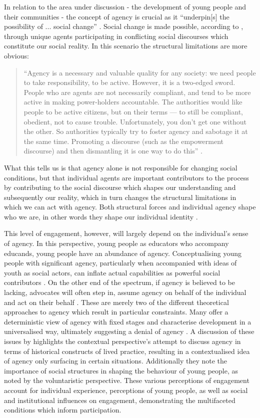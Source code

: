 In relation to the area under discussion - the development of young people and their communities - the concept of agency is crucial as it “underpin[s] the possibility of ... social change” \citep[][p243]{Barker2005}. Social change is made possible, according to \citet{Barker2005}, through unique agents participating in conflicting social discourses which constitute our social reality. In this scenario the structural limitations are more obvious: 
\begin{quote}“Agency is a necessary and valuable quality for any society: we need people to take responsibility, to be active. However, it is a two-edged sword. People who are agents are not necessarily compliant, and tend to be more active in making power-holders accountable. The authorities would like people to be active citizens, but on their terms — to still be compliant, obedient, not to cause trouble. Unfortunately, you don't get one without the other. So authorities typically try to foster agency and sabotage it at the same time. Promoting a discourse (such as the empowerment discourse) and then dismantling it is one way to do this” \citep[][p131]{Sercombe2010}. \end{quote}
What this tells us is that agency alone is not responsible for changing social conditions, but that individual agents are important contributors to the process by contributing to the social discourse which shapes our understanding and subsequently our reality, which in turn changes the structural limitations in which we can act with agency. Both structural forces and individual agency shape who we are, in other words they shape our individual identity \citep{Barker2005}. 

This level of engagement, however, will largely depend on the individual's sense of agency. In this perspective, young people as educators who accompany educands, young people have an abundance of agency. Conceptualising young people with significant agency, particularly when accompanied with ideas of youth as social actors, can inflate actual capabilities as powerful social contributors \citep[][p315]{White1998}. On the other end of the spectrum, if agency is believed to be lacking, advocates will often step in, assume agency on behalf of the individual and act on their behalf \citep[][p317]{White1998}. These are merely two of the different theoretical approaches to agency which result in particular constraints. Many offer a deterministic view of agency with fixed stages and characterise development in a universalised way, ultimately suggesting a denial of agency \citep[][p3219]{White1998}. A discussion of these issues by \citet{White1998} highlights the contextual perspective's attempt to discuss agency in terms of historical constructs of lived practice, resulting in a contextualised idea of agency only surfacing in certain situations. Additionally they note the importance of social structures in shaping the behaviour of young people, as noted by the voluntaristic perspective. These various perceptions of engagement account for individual experience, perceptions of young people, as well as social and institutional influences on engagement, demonstrating the multifaceted conditions which inform participation. 


